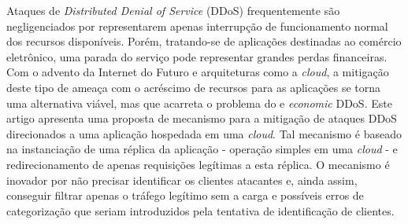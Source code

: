 
Ataques de \emph{Distributed Denial of Service} (DDoS) frequentemente são negligenciados por representarem apenas interrupção de funcionamento normal dos recursos disponíveis. Porém, tratando-se de aplicações destinadas ao comércio eletrônico, uma parada do serviço pode representar grandes perdas financeiras. Com o advento da Internet do Futuro e arquiteturas como a \emph{cloud}, a mitigação deste tipo de ameaça com o acréscimo de recursos para as aplicações se torna uma alternativa viável, mas que acarreta o problema do e \emph{economic} DDoS. Este artigo apresenta uma proposta de mecanismo para a mitigação de ataques DDoS direcionados a uma aplicação hospedada em uma \emph{cloud}. Tal mecanismo é baseado na instanciação de uma réplica da aplicação - operação simples em uma \emph{cloud} - e redirecionamento de apenas requisições legítimas a esta réplica. O mecanismo é inovador por não precisar identificar os clientes atacantes e, ainda assim, conseguir filtrar apenas o tráfego legítimo sem a carga e possíveis erros de categorização que seriam introduzidos pela tentativa de identificação de clientes.
